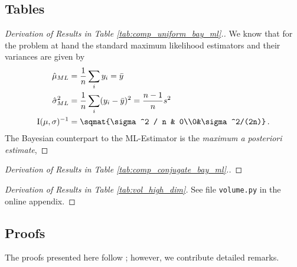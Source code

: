 \subsection{Tables}

\begin{proof}[Derivation of Results in Table \ref{tab:comp_uniform_bay_ml}.]
  We know that for the problem at hand the standard maximum likelihood estimators
  and their variances are given by
  \begin{align}
    \hat{\mu}_{ML} &= \frac{1}{n} \sum_i y_i = \bar{y}\,\\
    \hat{\sigma}_{ML}^2 &= \frac{1}{n} \sum_i (y_i - \bar{y})^2 = \frac{n-1}{n} s^2\,\\
    \mathrm{I}(\mu, \sigma)^{-1} &= \sqmat{\sigma^2 / n & 0\\0&\sigma^2/(2n)} \,.
  \end{align}
  The Bayesian counterpart to the ML-Estimator is the \emph{maximum a posteriori estimate},
\end{proof}

\begin{proof}[Derivation of Results in Table \ref{tab:comp_conjugate_bay_ml}.]

\end{proof}

\begin{proof}[Derivation of Results in Table \ref{tab:vol_high_dim}]
See file \lstinline{volume.py}{} in the online appendix.
\end{proof}

\subsection{Proofs}
\begin{remark}
The proofs presented here follow \citet{gelmanbda04}; however, we contribute detailed remarks.
\end{remark}

